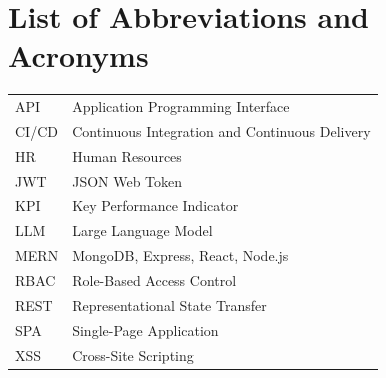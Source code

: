 \chapter*{List of Abbreviations and Acronyms}
\begin{longtable}{p{}p{}}
\toprule
API & Application Programming Interface\\
CI/CD & Continuous Integration and Continuous Delivery\\
HR & Human Resources\\
JWT & JSON Web Token\\
KPI & Key Performance Indicator\\
LLM & Large Language Model\\
MERN & MongoDB, Express, React, Node.js\\
RBAC & Role-Based Access Control\\
REST & Representational State Transfer\\
SPA & Single-Page Application\\
XSS & Cross-Site Scripting\\
\bottomrule
\end{longtable}
\clearpage
